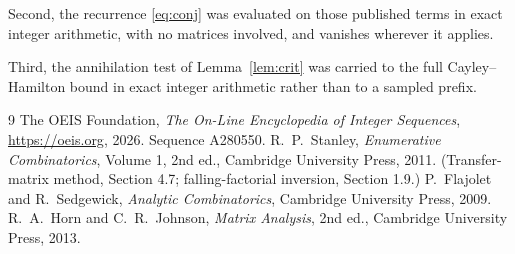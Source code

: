 \documentclass[11pt,a4paper]{article}
\theoremstyle{plain}
\theoremstyle{definition}
\begin{document}
Second, the recurrence \eqref{eq:conj} was evaluated on those published terms in exact
integer arithmetic, with no matrices involved, and vanishes wherever it applies.

Third, the annihilation test of Lemma~\ref{lem:crit} was carried to the full
Cayley--Hamilton bound in exact integer arithmetic rather than to a sampled prefix.

\begin{thebibliography}{9}
 The OEIS Foundation, \emph{The On-Line Encyclopedia of Integer
Sequences}, \url{https://oeis.org}, 2026. Sequence A280550.
 R.~P.~Stanley, \emph{Enumerative Combinatorics}, Volume 1, 2nd ed.,
Cambridge University Press, 2011. (Transfer-matrix method, Section 4.7; falling-factorial
inversion, Section 1.9.)
 P.~Flajolet and R.~Sedgewick, \emph{Analytic Combinatorics}, Cambridge
University Press, 2009.
 R.~A.~Horn and C.~R.~Johnson, \emph{Matrix Analysis}, 2nd ed., Cambridge
University Press, 2013.
\end{thebibliography}
\end{document}
